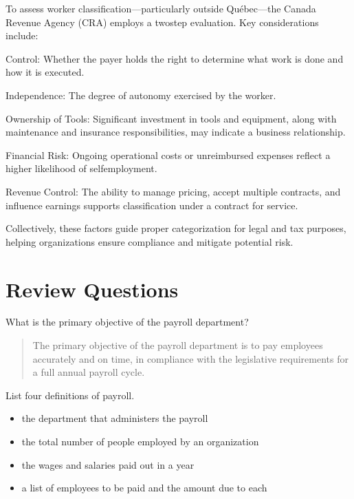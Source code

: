 \documentclass[letterpaper,10pt,english]{sphinxmanual}
\begin{document}
\sphinxAtStartPar
To assess worker classification—particularly outside Québec—the Canada Revenue Agency (CRA) employs a two\sphinxhyphen{}step evaluation. Key
considerations include:

\sphinxAtStartPar
Control: Whether the payer holds the right to determine what work is done and how it is executed.

\sphinxAtStartPar
Independence: The degree of autonomy exercised by the worker.

\sphinxAtStartPar
Ownership of Tools: Significant investment in tools and equipment, along with maintenance and insurance responsibilities, may indicate a business relationship.

\sphinxAtStartPar
Financial Risk: Ongoing operational costs or unreimbursed expenses reflect a higher likelihood of self\sphinxhyphen{}employment.

\sphinxAtStartPar
Revenue Control: The ability to manage pricing, accept multiple contracts, and influence earnings supports classification under a contract for service.

\sphinxAtStartPar
Collectively, these factors guide proper categorization for legal and tax purposes, helping organizations ensure compliance and mitigate potential risk.


\section{Review Questions}
\label{\detokenize{compliance:review-questions}}
\sphinxAtStartPar
What is the primary objective of the payroll department?
\begin{quote}

\sphinxAtStartPar
The primary objective of the payroll department is to pay employees accurately and
on time, in compliance with the legislative requirements for a full annual payroll
cycle.
\end{quote}

\sphinxAtStartPar
List four definitions of payroll.
\begin{itemize}
\item {} 
\sphinxAtStartPar
the department that administers the payroll

\item {} 
\sphinxAtStartPar
the total number of people employed by an organization

\item {} 
\sphinxAtStartPar
the wages and salaries paid out in a year

\item {} 
\sphinxAtStartPar
a list of employees to be paid and the amount due to each

\end{itemize}
\end{document}

